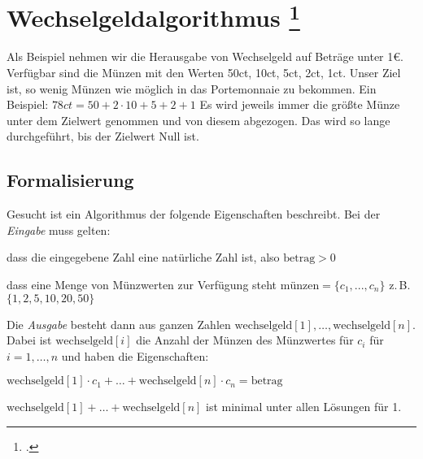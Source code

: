 \documentclass{lehramt-informatik-aufgabe}
\begin{document}

\section{Wechselgeldalgorithmus
\footcite{net:html:wikiversity:wechselgeld}}

Als Beispiel nehmen wir die Herausgabe von Wechselgeld auf Beträge unter
1€. Verfügbar sind die Münzen mit den Werten 50ct, 10ct, 5ct, 2ct, 1ct.
Unser Ziel ist, so wenig Münzen wie möglich in das Portemonnaie zu
bekommen.
%
Ein Beispiel: $78ct = 50 + 2 \cdot 10 + 5 + 2 + 1$
%
Es wird jeweils immer die größte Münze unter dem Zielwert genommen und
von diesem abgezogen. Das wird so lange durchgeführt, bis der Zielwert
Null ist.

%

\subsection{Formalisierung}

Gesucht ist ein Algorithmus der folgende Eigenschaften beschreibt.
Bei der \emph{Eingabe} muss gelten:

\bigskip

\begin{compactenum}
\item dass die eingegebene Zahl eine natürliche Zahl ist, also
$\text{betrag} > 0$

\item dass eine Menge von Münzwerten zur Verfügung steht $
\text{münzen}=\{c_1,...,c_n\}$ z.\,B. $\{1,2,5,10,20,50\}$
\end{compactenum}

\bigskip

\noindent
Die \emph{Ausgabe} besteht dann aus ganzen Zahlen
$\text{wechselgeld}[1], \ldots ,\text{wechselgeld}[n]$.
Dabei ist $\text{wechselgeld}[i] $ die Anzahl der Münzen
des Münzwertes für $ c_i $ für $ i=1,\ldots,n $ und haben die
Eigenschaften:

\bigskip

\begin{compactenum}
\item $\text{wechselgeld}[1] \cdot c_1 + \ldots +
\text{wechselgeld}[n] \cdot c_n = \text{betrag}$

\item $\text{wechselgeld}[1] + \ldots + \text{wechselgeld}[n] $
ist minimal unter allen Lösungen für 1.
\end{compactenum}

%

\begin{liAntwort}
\end{liAntwort}
\end{document}
